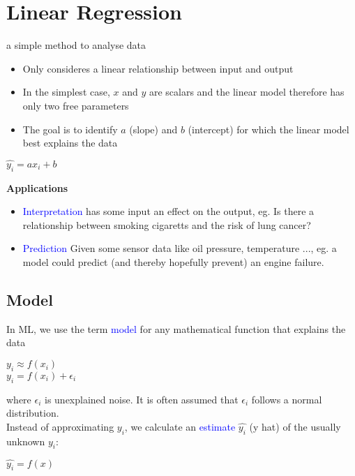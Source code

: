 \section{Linear Regression}
a simple method to analyse data \\

\begin{itemize}
    \item Only consideres a linear relationship between input and output
    \item In the simplest case, $x$ and $y$ are scalars and the linear model therefore has only two free parameters
    \item The goal is to identify $a$ (slope) and $b$ (intercept) for which the linear model best explains the data
\end{itemize}
\begin{center}
    $\hat{y_i} = ax_i + b$
\end{center}

\textbf{Applications}
\begin{itemize}
    \item \textcolor{blue}{Interpretation} has some input an effect on the output, eg. Is there a relationship between smoking cigaretts and the risk of lung cancer?
    \item \textcolor{blue}{Prediction} Given some sensor data like oil pressure, temperature ..., eg. a model could predict (and thereby hopefully prevent) an engine failure.
\end{itemize}

\subsection{Model}
In ML, we use the term \textcolor{blue}{model} for any mathematical function that explains the data\\
\begin{center}
    $y_i \approx f(x_i)$\\
    $y_i = f(x_i) + \epsilon_i$\\
\end{center}
where $\epsilon_i$ is unexplained noise. It is often assumed that $\epsilon_i$ follows a normal distribution.\\
Instead of approximating $y_i$, we calculate an \textcolor{blue}{estimate} $\hat{y_i}$ (y hat) of the usually unknown $y_i$: \\
\begin{center}
    $\hat{y_i} = f(x)$
\end{center}



